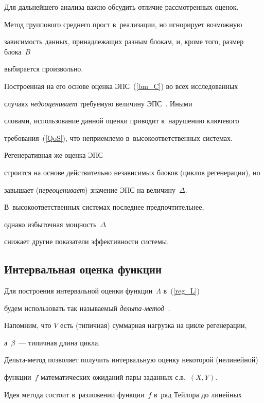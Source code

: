Для дальнейшего анализа   важно обсудить  отличие рассмотренных оценок.


Метод группового среднего прост в~реализации, но игнорирует возможную  


зависимость данных, принадлежащих разным блокам, и, кроме того, размер блока~$B$ 


выбирается произвольно.


Построенная на его основе  оценка ЭПС~(\ref{bm_C})  во всех исследованных 


случаях {\it недооценивает} требуемую величину ЭПС~\cite{ICUMT, EB14}. Иными 


словами, использование данной оценки приводит к~нарушению ключевого  


требования~(\ref{QoS}), что неприемлемо в~высокоответственных системах.


Регенеративная же  оценка ЭПС


строится на основе действительно независимых  блоков (циклов регенерации), но  


завышает ({\it переоценивает}) значение  ЭПС на  величину~$\Delta$.


В~высокоответственных системах последнее  предпочтительнее,


однако избыточная мощность~$\Delta$


снижает  другие показатели эффективности  системы.





\subsection{Интервальная оценка функции {\boldmath{$\Lambda$}}}





Для построения интервальной оценки функции~$\Lambda$ в~(\ref{reg_L})


  будем использовать так называемый {\it дель\-та-ме\-тод}~\cite{AsmussenGlynn}.


Напомним, что $V$ есть (типичная) суммарная нагрузка на цикле регенерации, 


а~$\beta$~--- типичная длина цикла.


Дель\-та-ме\-тод позволяет получить интервальную оценку  некоторой (нелинейной) 


функции~$f$  математических ожиданий пары  заданных  с.в.~$(X,Y)$.


Идея метода состоит в~разложении функции~$f$  в~ряд Тейлора до линейных 


